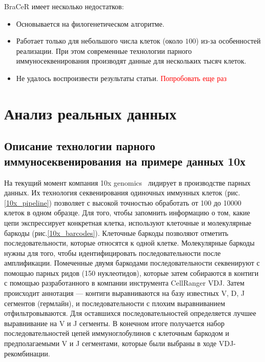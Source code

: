 \documentclass{spbau-diploma}
\newcommand{\todo}{\textcolor{red}}
\begin{document}
BraCeR имеет несколько недостатков:
\begin{itemize}
    \item Основывается на филогенетическом алгоритме.
    \item Работает только для небольшого числа клеток (около $100$) из-за особенностей реализации. При этом современные технологии парного иммуносеквенирования производят данные для нескольких тысяч клеток.
    \item Не удалось воспроизвести результаты статьи. \todo{Попробовать еще раз}
\end{itemize}


\section{Анализ реальных данных}

\subsection{Описание технологии парного иммуносеквенирования на примере данных 10х}

На текущий момент компания 10x genomics~\cite{pmid28091601} лидирует в производстве парных данных.
Их технология секвенирования одиночных иммунных клеток (рис.\ref{10x_pipeline}) позволяет с высокой точностью обработать от 100 до 10000 клеток в одном образце.
Для того, чтобы запомнить информацию о том, какие цепи экспрессирует конкретная клетка, используют клеточные и молекулярные баркоды (рис.\ref{10x_barcodes}).
Клеточные баркоды позволяют отметить последовательности, которые относятся к одной клетке.
Молекулярные баркоды нужны для того, чтобы идентифицировать последовательности после амплификации.
Помеченные двумя баркодами последовательности секвенируют с помощью парных ридов (150 нуклеотидов), которые затем собираются в контиги с помощью разработанного в компании инструмента CellRanger VDJ.
Затем происходит аннотация --- контиги выравниваются на базу известных V, D, J сегментов (гермлайн), и последовательности с плохим выравниванием отфильтровываются.
Для оставшихся последовательностей определяется лучшее выравнивание на V и J сегменты.
В конечном итоге получается набор последовательностей цепей иммуноглобулинов с клеточным баркодом и предполагаемыми V и J сегментами, которые были выбраны в ходе VDJ-рекомбинации.
\end{document}
